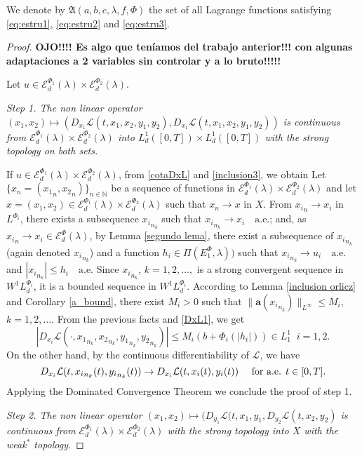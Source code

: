 \documentclass[twoside]{article}
\theoremstyle{remark}
\newcommand{\lphii}{L^{\Phi_i}}
\newcommand{\ephi}{E^{\Phi}}
\newcommand{\wphii}{W^{1}\lphii}
\newcommand{\domi}{\mathcal{E}^{\Phi}_d(\lambda)}
\newcommand{\domiuno}{\mathcal{E}^{\Phi_1}_d(\lambda)}
\newcommand{\domidos}{\mathcal{E}^{\Phi_2}_d(\lambda)}
\renewcommand{\b}[1]{\boldsymbol{#1}}
\renewcommand{\leq}{\leqslant}
\begin{document}
We denote by $\mathfrak{A}(a,b,c,\lambda,f,\Phi)$ the set of all Lagrange functions satisfying  \eqref{eq:estru1}, \eqref{eq:estru2} and \eqref{eq:estru3}.


\begin{proof} 

{\bf OJO!!!! Es algo que ten\'iamos del trabajo anterior!!! 
con algunas adaptaciones a 2 variables sin controlar y a lo bruto!!!!!}

Let $u\in \domiuno\times\domidos$.

\noindent\emph{Step 1. The non linear operator  $(x_1,x_2) \mapsto (D_{x_1}\mathcal{L}(t,x_1,x_2,y_1,y_2),
D_{x_1}\mathcal{L}(t,x_1,x_2,y_1,y_2))$ is continuous from $\domiuno\times\domidos$ into $L^{1}_d([0,T])\times L^1_d([0,T])$ with the strong topology on both sets.} 


If $u\in \domiuno\times\domidos$, from \eqref{cotaDxL} and \eqref{inclusion3}, we obtain 
Let   $\{x_n=({x_1}_n,{x_2}_n)\}_{n\in \mathbb{N}}$ be a sequence of  functions in $\domiuno\times\domidos$  and let 
$x=(x_1,x_2)\in \domiuno\times\domidos$  such that $x_n\rightarrow x$ in $X$.
From  ${x_i}_n\rightarrow x_i$ in $\lphii$, there exists a subsequence ${x_i}_{n_k}$ such that ${x_i}_{n_k}\rightarrow x_i \quad\text{a.e.}$; and, as ${x_i}_n\rightarrow x_i \in\domi$, by 
  Lemma \ref{segundo lema}, there exist a subsequence of  ${x_i}_{n_k}$ (again denoted ${x_i}_{n_k}$) and a function  $h_i\in \Pi(\ephi_1,\lambda))$
such that  ${x_i}_{n_k}\rightarrow u_i \quad\text{a.e.}$ and $|{x_i}_{n_k}|\leq h_i\quad\text{a.e}$.  
Since ${x_i}_{n_k}$, $k=1,2,\ldots,$ is a strong convergent sequence in $\wphii_d$, it is a bounded sequence in $\wphii_d$. According to Lemma \ref{inclusion orlicz} and Corollary \ref{a_bound}, there exist $M_i>0$ such that $\|\b{a}({x_i}_{n_k})\|_{L^{\infty}} \leq M_i$, $k=1,2,\ldots$.  From the previous facts and \eqref{DxL1}, we get
\begin{equation*}\label{DxL1-bis}
|D_{x_i}\mathcal{L}(\cdot,{x_1}_{n_k},{x_2}_{n_k},{y_1}_{n_k},{y_2}_{n_k})|\leq 
M_i (b+\Phi_i(|h_i|)) \in L^1_1\;\;i=1,2.
\end{equation*}
On the other hand, by the continuous differentiability of $\mathcal{L}$, we have
\[D_{x_i}\mathcal{L}(t,{x_i}_{n_k}(t),{y_i}_{n_k}(t))\to D_{x_i}\mathcal{L}(t,x_i(t), y_i(t))\quad\hbox{ for a.e. } t\in[0,T].\]
Applying the Dominated Convergence Theorem we conclude the proof of step 1.

\noindent\emph{Step 2. The non linear operator   
$(x_1,x_2)\mapsto (D_{y_1}\mathcal{L}(t,x_1,y_1, D_{y_2}\mathcal{L}(t,x_2,y_2)$ is continuous from $\domiuno\times\domidos$ with the strong topology  into $X$  with the weak$^*$ topology.}



\end{proof}
\end{document}
